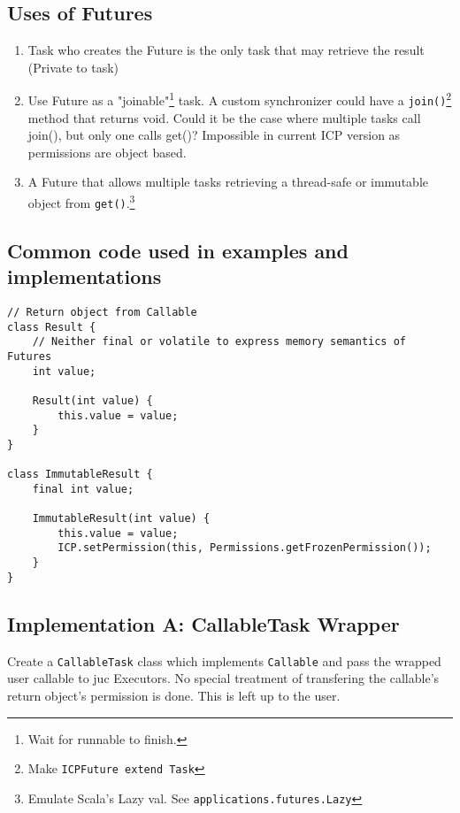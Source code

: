 \subsection{Uses of Futures}
\begin{enumerate}[label=Use \arabic*., itemindent=*, leftmargin=0pt, ref=\arabic*]
    \item \label{lst:futures:use:1} Task who creates the Future is the only task that may retrieve the result (Private to task)
    \item \label{lst:futures:use:2} Use Future as a "joinable"\footnote{Wait for runnable to finish.} task. A custom synchronizer
    could have a \lstinline{join()}\footnote{Make \lstinline{ICPFuture extend Task}}
    method that returns void. Could it be the case where multiple tasks call join(), but only one
    calls get()? Impossible in current ICP version as permissions are object based.
    \item \label{lst:futures:use:3} A Future that allows multiple tasks retrieving a thread-safe or immutable object from
    \lstinline{get()}.\footnote{Emulate Scala's Lazy val. See \lstinline{applications.futures.Lazy}}
\end{enumerate}

\subsection{Common code used in examples and implementations}

    \begin{lstlisting}
// Return object from Callable
class Result {
    // Neither final or volatile to express memory semantics of Futures
    int value;

    Result(int value) {
        this.value = value;
    }
}

class ImmutableResult {
    final int value;

    ImmutableResult(int value) {
        this.value = value;
        ICP.setPermission(this, Permissions.getFrozenPermission());
    }
}
    \end{lstlisting}

\subsection{Implementation A: CallableTask Wrapper} \label{sec:futures:sub:implementation:1}
Create a \lstinline{CallableTask} class which implements \lstinline{Callable} and pass the wrapped
user callable to \gls{juc} Executors. No special treatment of transfering the callable's return object's
permission is done. This is left up to the user.

